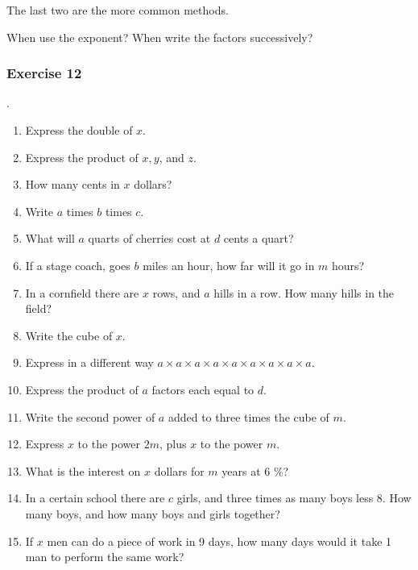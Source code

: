 \documentclass{book}
\begin{document}
The last two are the more common methods.

When use the exponent? When write the factors successively?

\subsubsection*{Exercise 12}.

\begin{enumerate}
\item Express the double of $x$.

\item Express the product of $x, y$, and $z$.

\item How many cents in $x$ dollars?

\item Write $a$ times $b$ times $c$.

\item What will $a$ quarts of cherries cost at $d$ cents a quart?

\item If a stage coach, goes $b$ miles an hour, how far will it go
in $m$ hours?

\item In a cornfield there are $x$ rows, and $a$ hills in a row.
How many hills in the field?

\item Write the cube of $x$.

\item Express in a different way $a \times a \times a \times a
\times a \times a \times a \times a \times a$.

\item Express the product of $a$ factors each equal to $d$.

\item Write the second power of $a$ added to three times the cube
of $m$.

\item Express $x$ to the power $2m$, plus $x$ to the power $m$.

\item What is the interest on $x$ dollars for $m$ years at 6 \%?

\item In a certain school there are $c$ girls, and three times as
many boys less 8. How many boys, and how many boys and girls
together?

\item If $x$ men can do a piece of work in 9 days, how many days
would it take 1 man to perform the same work?


\end{enumerate}
\end{document}
